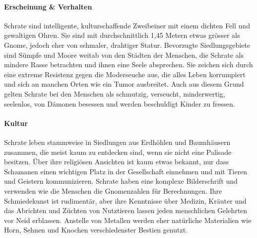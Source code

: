 \documentclass[10pt,twoside,twocolumn,openany]{book}
\begin{document}
\begin{multicols}{2}
	\paragraph{Erscheinung \& Verhalten}
	Schrate sind intelligente, kulturschaffende Zweibeiner mit einem dichten Fell und gewaltigen Ohren. Sie sind mit durchschnittlich 1,45 Metern etwas grösser als Gnome, jedoch eher von schmaler, drahtiger Statur. Bevorzugte Siedlungsgebiete sind Sümpfe und Moore weitab von den Städten der Menschen, die Schrate als mindere Rasse betrachten und ihnen eine Seele absprechen. Sie zeichen sich durch eine extreme Resistenz gegen die Moderseuche aus, die alles Leben korrumpiert und sich an manchen Orten wie ein Tumor ausbreitet. Auch aus diesem Grund gelten Schrate bei den Menschen als schmutzig, verseucht, minderwertig, seelenlos, von Dämonen besessen und werden beschuldigt Kinder zu fressen.
	
	
	
	\paragraph{Kultur}
	Schrate leben stammweise in Siedlungen  aus Erdhöhlen und Baumhäusern zusammen, die meist kaum zu entdecken sind, wenn sie nicht eine Palisade besitzen. Über ihre religiösen Ansichten ist kaum etwas bekannt, nur dass Schamanen einen wichtigen Platz in der Gesellschaft einnehmen und mit Tieren und Geistern kommunizieren.
Schrate haben eine komplexe Bilderschrift und verwenden wie die Menschen die Gnomenzahlen für Berechnungen. Ihre Schmiedekunst ist rudimentär, aber ihre Kenntnisse über Medizin, Kräuter und das Abrichten und Züchten von Nutztieren lassen jeden menschlichen Gelehrten vor Neid erblassen. Anstelle von Metallen werden eher natürliche Materialien wie Horn, Sehnen und Knochen verschiedenster Bestien genutzt.

\end{multicols}
\end{document}
